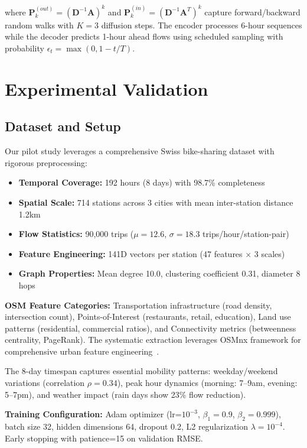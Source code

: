 \documentclass[10pt,twocolumn]{article}
\begin{document}
where $\mathbf{P}_k^{(out)} = {(\mathbf{D}^{-1}\mathbf{A})}^k$ and $\mathbf{P}_k^{(in)} = {(\mathbf{D}^{-1}\mathbf{A}^T)}^k$ capture forward/backward random walks with $K=3$ diffusion steps. The encoder processes 6-hour sequences while the decoder predicts 1-hour ahead flows using scheduled sampling with probability $\epsilon_t = \max(0, 1 - t/T)$.

\section{Experimental Validation}

\subsection{Dataset and Setup}
Our pilot study leverages a comprehensive Swiss bike-sharing dataset with rigorous preprocessing:
\begin{itemize}
\item \textbf{Temporal Coverage:} 192 hours (8 days) with 98.7\% completeness
\item \textbf{Spatial Scale:} 714 stations across 3 cities with mean inter-station distance 1.2km
\item \textbf{Flow Statistics:} 90,000 trips ($\mu=12.6$, $\sigma=18.3$ trips/hour/station-pair)
\item \textbf{Feature Engineering:} 141D vectors per station (47 features $\times$ 3 scales)
\item \textbf{Graph Properties:} Mean degree 10.0, clustering coefficient 0.31, diameter 8 hops
\end{itemize}

\textbf{OSM Feature Categories:} Transportation infrastructure (road density, intersection count), Points-of-Interest (restaurants, retail, education), Land use patterns (residential, commercial ratios), and Connectivity metrics (betweenness centrality, PageRank). The systematic extraction leverages OSMnx framework for comprehensive urban feature engineering~\cite{boeing2017}.

The 8-day timespan captures essential mobility patterns: weekday/weekend variations (correlation $\rho=0.34$), peak hour dynamics (morning: 7--9am, evening: 5--7pm), and weather impact (rain days show 23\% flow reduction).

\textbf{Training Configuration:} Adam optimizer (lr=$10^{-3}$, $\beta_1=0.9$, $\beta_2=0.999$), batch size 32, hidden dimensions 64, dropout 0.2, L2 regularization $\lambda=10^{-4}$\@. Early stopping with patience=15 on validation RMSE.
\end{document}
